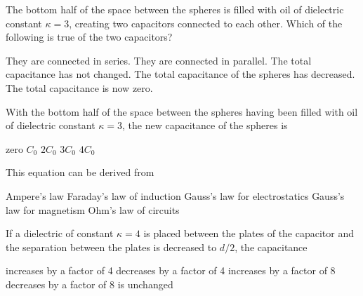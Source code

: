 \documentclass{../../../oss-apphys-exam}
\begin{document}
\begin{questions}
  \question The bottom half of the space between the spheres is filled with
  oil of dielectric constant $\kappa=3$, creating two capacitors connected to
  each other. Which of the following is true of the two capacitors?
  \begin{center}
  \end{center}
  \begin{choices}
    \choice They are connected in series.
    \choice They are connected in parallel.
    \choice The total capacitance has not changed.
    \choice The total capacitance of the spheres has decreased.
    \choice The total capacitance is now zero.
  \end{choices}
    
  \question With the bottom half of the space between the spheres having been
  filled with oil of dielectric constant $\kappa=3$, the new capacitance of
  the spheres is
  \label{cap2}
  \begin{choices}
    \choice zero
    \choice $C_0$
    \choice $2C_0$
    \choice $3C_0$
    \choice $4C_0$
  \end{choices}

  \question This equation can be derived from
  \begin{choices}
    \choice Ampere's law
    \choice Faraday's law of induction
    \choice Gauss's law for electrostatics
    \choice Gauss's law for magnetism
    \choice Ohm's law of circuits
  \end{choices}
  \label{plate1}
    
  \question If a dielectric of constant $\kappa=4$ is placed between the
  plates of the capacitor and the separation between the plates is decreased
  to $d/2$, the capacitance
  \begin{choices}
    \choice increases by a factor of 4
    \choice decreases by a factor of 4
    \choice increases by a factor of 8
    \choice decreases by a factor of 8
    \choice is unchanged
  \end{choices}
  \label{plate2}
    

\end{questions}
\end{document}
